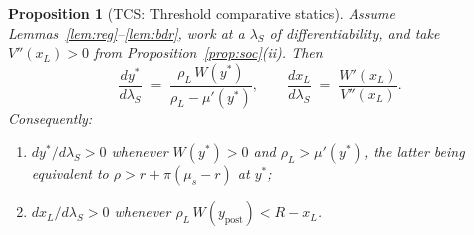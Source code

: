 \documentclass[11pt]{article}
\newtheorem{proposition}{Proposition}
\theoremstyle{remark}
\begin{document}
\begin{proposition}[TCS: Threshold comparative statics]
\label{prop:tcs}
Assume Lemmas~\ref{lem:reg}--\ref{lem:bdr}, work at a $\lambda_S$ of
differentiability, and take $V''(x_L)>0$ from
Proposition~\ref{prop:soc}(ii). Then
\begin{equation}
\frac{dy^*}{d\lambda_S} \;=\; \frac{\rho_L\,W(y^*)}{\rho_L - \mu'(y^*)},
\qquad
\frac{dx_L}{d\lambda_S} \;=\; \frac{W'(x_L)}{V''(x_L)} .
\label{eq:tcs}
\end{equation}
Consequently:
\begin{enumerate}
\item[(i)] $dy^*/d\lambda_S > 0$ whenever $W(y^*)>0$ and
  $\rho_L > \mu'(y^*)$, the latter being equivalent to
  $\rho > r + \pi(\mu_s - r)$ at $y^*$;
\item[(ii)] $dx_L/d\lambda_S > 0$ whenever
  $\rho_L\,W(y_{\mathrm{post}}) < R - x_L$.
\end{enumerate}
\end{proposition}
\end{document}
